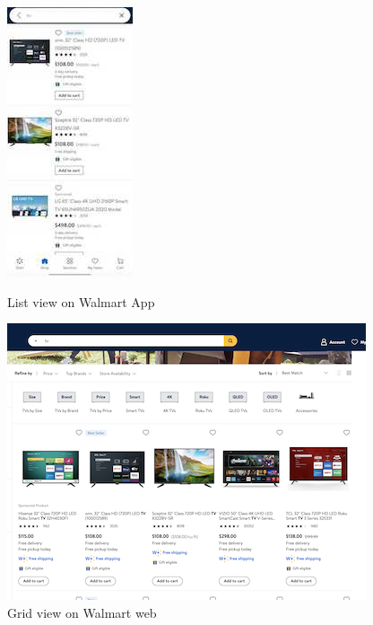 \documentclass[11pt]{article}
\begin{document}
\begin{figure}[t!]
\vspace{5mm}
\hspace{-3cm}
   \centering
   \includegraphics[bb= 0 0 105 225, valign=t]{figs/walmart_app_px.jpg}
   \caption{List view on Walmart App}
   \centering
   \includegraphics[bb= 0 0 300 188, valign=t]{figs/walmart_web_px.png}
   \caption{Grid view on Walmart web}
   \Description{}
\end{figure}
\end{document}
